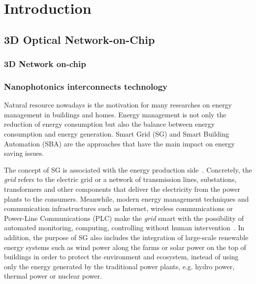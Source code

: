 
\chapter{Introduction} %
\label{Introduction}

\section{3D Optical Network-on-Chip}
\subsection{3D Network on-chip}
\subsection{Nanophotonics interconnects technology}
Natural resource nowadays is the motivation for many researches on energy management in buildings and homes. Energy management is not only the reduction of energy consumption but also the balance between energy consumption and energy generation. 
Smart Grid (SG) and Smart Building Automation (SBA) are the approaches that have the main impact on energy saving issues. 

The concept of SG is associated with the energy production side~\cite{smartgrid}. Concretely, the \textit{grid} refers to the electric grid or a network of transmission lines, substations, transformers and other components that deliver the electricity from the power plants to the consumers. Meanwhile, modern energy management techniques and communication infrastructures such as Internet, wireless communications or Power-Line Communications (PLC)  make the \textit{grid} smart with the possibility of automated monitoring, computing, controlling without human intervention~\cite{Galli5622060,Galli5768099,Gungor6011696,Berger2013}. In addition, the purpose of SG also includes the integration of large-scale renewable energy systems such as wind power along the farms or solar power on the top of buildings  in order to protect the environment and ecosystem, instead of using only the  energy generated by the traditional power plants, e.g. hydro power, thermal power or nuclear power. 

